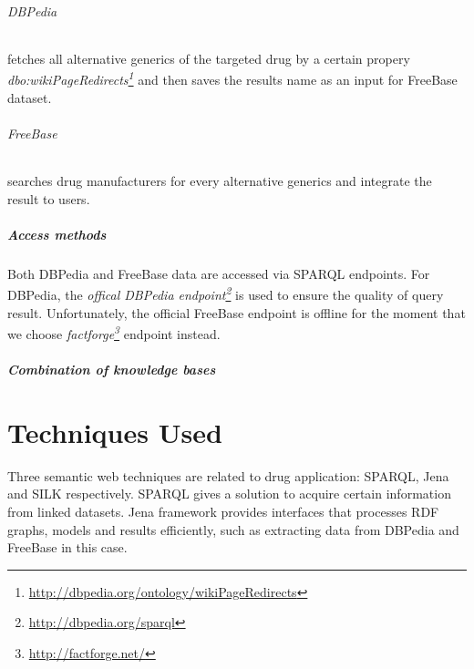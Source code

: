 \documentclass[11pt,titlepage,oneside,openany]{book}
\begin{document}
\subparagraph{DBPedia}
\label{dbpedia}
fetches all alternative generics of the targeted drug by a certain propery \textit{ dbo:wikiPageRedirects\footnote{\url{http://dbpedia.org/ontology/wikiPageRedirects}}} and then saves the results name as an input for FreeBase dataset.
\subparagraph{FreeBase}
\label{freebase}
searches drug manufacturers for every alternative generics and integrate the result to users.

\paragraph{Access methods}
\label{sec:access_methods}
Both DBPedia and FreeBase data are accessed via SPARQL endpoints. For DBPedia, the \textit{offical DBPedia endpoint\footnote{\url{http://dbpedia.org/sparql}}} is used to ensure the quality of query result. Unfortunately, the official FreeBase endpoint is offline for the moment that we choose \textit{factforge\footnote{\url{http://factforge.net/}}} endpoint instead.
\paragraph{Combination of knowledge bases}
\label{sec:dataset_combination}




\chapter{Techniques Used}
\label{cha:technique}
Three semantic web techniques are related to drug application: SPARQL, Jena and SILK respectively.
SPARQL gives a solution to acquire certain information from linked datasets.
Jena framework provides interfaces that processes RDF graphs, models and results efficiently, such as extracting data from DBPedia and FreeBase in this case. 
\end{document}
